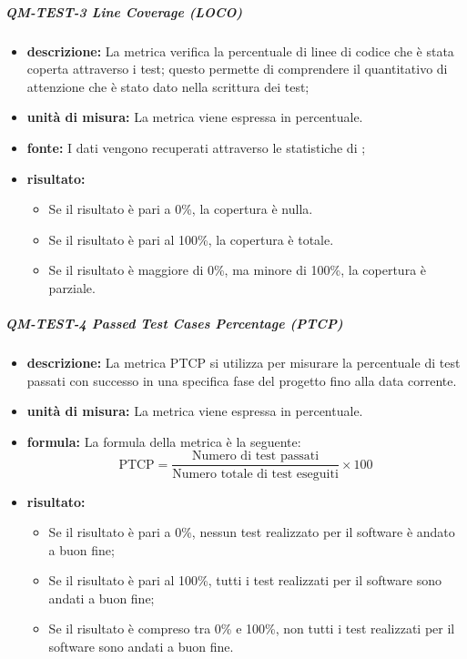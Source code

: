             \subparagraph{QM-TEST-3 Line Coverage (LOCO)}
            \begin{itemize}
                \item \textbf{descrizione: }
                    La metrica verifica la percentuale di linee di codice che è stata coperta attraverso i test; questo permette di comprendere il quantitativo di attenzione che è stato dato nella scrittura dei test;

                \item \textbf{unità di misura: }
                La metrica viene espressa in percentuale.

                \item \textbf{fonte: }
                    I dati vengono recuperati attraverso le statistiche di ;

                \item \textbf{risultato: }
                \begin{itemize}
                    \item Se il risultato è pari a 0\%, la copertura è nulla.
                    \item Se il risultato è pari al 100\%, la copertura è totale.
                    \item Se il risultato è maggiore di 0\%, ma minore di 100\%, la copertura è parziale.
                \end{itemize}
            \end{itemize}

            \subparagraph{QM-TEST-4 Passed Test Cases Percentage (PTCP)}
            \begin{itemize}
                \item \textbf{descrizione: }
                La metrica PTCP si utilizza per misurare la percentuale di test passati con successo in una specifica fase del progetto fino alla data corrente.

                \item \textbf{unità di misura: }
                La metrica viene espressa in percentuale.

                \item \textbf{formula: }
                La formula della metrica è la seguente:
                \[
                    \text{PTCP} = \frac{\text{Numero di test passati}}{\text{Numero totale di test eseguiti}} \times 100
                \]

                \item \textbf{risultato: }
                \begin{itemize}
                    \item Se il risultato è pari a 0\%, nessun test realizzato per il software è andato a buon fine;
                    \item Se il risultato è pari al 100\%, tutti i test realizzati per il software sono andati a buon fine;
                    \item Se il risultato è compreso tra 0\% e 100\%, non tutti i test realizzati per il software sono andati a buon fine.
                \end{itemize}
            \end{itemize}

